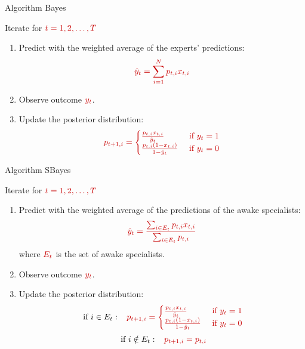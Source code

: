 \documentclass{beamer}
\newcommand{\redmath}[1]{\textcolor{mathred}{#1}}
\begin{document}
\begin{small}

\begin{frame}{Algorithm Bayes}

  Iterate for $\redmath{t = 1, 2, \dots, T}$
  \pause
\begin{enumerate}
    \item Predict with the weighted average of the experts' predictions:
          \[
          \redmath{\hat{y}_t = \sum_{i=1}^{N} p_{t,i} x_{t,i}}
          \]
    \item Observe outcome $\redmath{y_t}$.
    \item Update the posterior distribution:
          \[
            \redmath{p_{t+1,i} = 
            \begin{cases}
              \frac{p_{t,i} x_{t,i}}{\hat{y}_t} & \mbox{ if } y_t=1\\
              \frac{p_{t,i} (1-x_{t,i})}{1-\hat{y}_t} & \mbox{ if } y_t=0
            \end{cases}}
        \]
        
\end{enumerate}
\end{frame}

\begin{frame}{Algorithm SBayes}

  Iterate for $\redmath{t = 1, 2, \dots, T}$
  \pause
\begin{enumerate}
    \item Predict with the weighted average of the predictions of the awake specialists:
          \[ \redmath{
            \hat{y}_t = \frac{\sum_{i \in E_t} p_{t,i} x_{t,i}}
            {\sum_{i \in E_t} p_{t,i}}}
          \]
          where $\redmath{E_t}$ is the set of awake specialists.
    \item Observe outcome $\redmath{y_t}$.
\item Update the posterior distribution:
          \[\mbox{ if } i \in E_t: \;\;\;
            \redmath{p_{t+1,i} =
                          \begin{cases}
              \frac{p_{t,i} x_{t,i}}{\hat{y}_t} & \mbox{ if } y_t=1\\
              \frac{p_{t,i} (1-x_{t,i})}{1-\hat{y}_t} & \mbox{ if } y_t=0
            \end{cases}}
          \]
          \[\mbox{ if } i \notin E_t: \;\;\;
            \redmath{p_{t+1,i} =   p_{t,i}}
          \]
\end{enumerate}


\end{frame}
\end{small}
\end{document}
